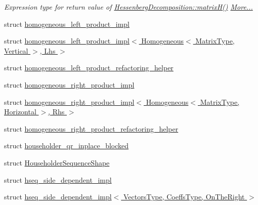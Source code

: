 \begin{DoxyCompactItemize}
\begin{DoxyCompactList}\small\item\em Expression type for return value of \hyperlink{group___eigenvalues___module_a8e781d2e22a2304647bcf0ae913cc8ea}{Hessenberg\+Decomposition\+::matrix\+H()}  \hyperlink{group___eigenvalues___module_struct_eigen_1_1internal_1_1_hessenberg_decomposition_matrix_h_return_type}{More...}\end{DoxyCompactList}\item 
struct \hyperlink{struct_eigen_1_1internal_1_1homogeneous__left__product__impl}{homogeneous\+\_\+left\+\_\+product\+\_\+impl}
\item 
struct \hyperlink{struct_eigen_1_1internal_1_1homogeneous__left__product__impl_3_01_homogeneous_3_01_matrix_type_042480d8c61b8193bc4c7039abeeef67a}{homogeneous\+\_\+left\+\_\+product\+\_\+impl$<$ Homogeneous$<$ Matrix\+Type, Vertical $>$, Lhs $>$}
\item 
struct \hyperlink{struct_eigen_1_1internal_1_1homogeneous__left__product__refactoring__helper}{homogeneous\+\_\+left\+\_\+product\+\_\+refactoring\+\_\+helper}
\item 
struct \hyperlink{struct_eigen_1_1internal_1_1homogeneous__right__product__impl}{homogeneous\+\_\+right\+\_\+product\+\_\+impl}
\item 
struct \hyperlink{struct_eigen_1_1internal_1_1homogeneous__right__product__impl_3_01_homogeneous_3_01_matrix_type_ef182dac64ca84d6bf223cfad456dbfc}{homogeneous\+\_\+right\+\_\+product\+\_\+impl$<$ Homogeneous$<$ Matrix\+Type, Horizontal $>$, Rhs $>$}
\item 
struct \hyperlink{struct_eigen_1_1internal_1_1homogeneous__right__product__refactoring__helper}{homogeneous\+\_\+right\+\_\+product\+\_\+refactoring\+\_\+helper}
\item 
struct \hyperlink{struct_eigen_1_1internal_1_1householder__qr__inplace__blocked}{householder\+\_\+qr\+\_\+inplace\+\_\+blocked}
\item 
struct \hyperlink{struct_eigen_1_1internal_1_1_householder_sequence_shape}{Householder\+Sequence\+Shape}
\item 
struct \hyperlink{struct_eigen_1_1internal_1_1hseq__side__dependent__impl}{hseq\+\_\+side\+\_\+dependent\+\_\+impl}
\item 
struct \hyperlink{struct_eigen_1_1internal_1_1hseq__side__dependent__impl_3_01_vectors_type_00_01_coeffs_type_00_01_on_the_right_01_4}{hseq\+\_\+side\+\_\+dependent\+\_\+impl$<$ Vectors\+Type, Coeffs\+Type, On\+The\+Right $>$}
\item 

\end{DoxyCompactItemize}

